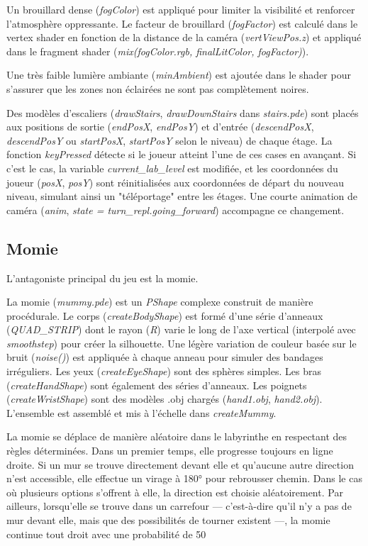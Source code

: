 \documentclass[12pt,oneside,letterpaper]{article}
\begin{document}
Un brouillard dense (\textit{fogColor}) est appliqué pour limiter la visibilité et renforcer l'atmosphère oppressante. Le facteur de brouillard (\textit{fogFactor}) est calculé dans le vertex shader en fonction de la distance de la caméra (\textit{vertViewPos.z}) et appliqué dans le fragment shader (\textit{mix(fogColor.rgb, finalLitColor, fogFactor)}).

Une très faible lumière ambiante (\textit{minAmbient}) est ajoutée dans le shader pour s'assurer que les zones non éclairées ne sont pas complètement noires.

Des modèles d'escaliers (\textit{drawStairs}, \textit{drawDownStairs} dans \textit{stairs.pde}) sont placés aux positions de sortie (\textit{endPosX}, \textit{endPosY}) et d'entrée (\textit{descendPosX}, \textit{descendPosY} ou \textit{startPosX}, \textit{startPosY} selon le niveau) de chaque étage. La fonction \textit{keyPressed} détecte si le joueur atteint l'une de ces cases en avançant. Si c'est le cas, la variable \textit{current\_lab\_level} est modifiée, et les coordonnées du joueur (\textit{posX}, \textit{posY}) sont réinitialisées aux coordonnées de départ du nouveau niveau, simulant ainsi un "téléportage" entre les étages. Une courte animation de caméra (\textit{anim}, \textit{state = turn\_repl.going\_forward}) accompagne ce changement.

\subsection{Momie}

L'antagoniste principal du jeu est la momie.

La momie (\textit{mummy.pde}) est un \textit{PShape} complexe construit de manière procédurale. Le corps (\textit{createBodyShape}) est formé d'une série d'anneaux (\textit{QUAD\_STRIP}) dont le rayon (\textit{R}) varie le long de l'axe vertical (interpolé avec \textit{smoothstep}) pour créer la silhouette. Une légère variation de couleur basée sur le bruit (\textit{noise()}) est appliquée à chaque anneau pour simuler des bandages irréguliers. Les yeux (\textit{createEyeShape}) sont des sphères simples. Les bras (\textit{createHandShape}) sont également des séries d'anneaux. Les poignets (\textit{createWristShape}) sont des modèles .obj chargés (\textit{hand1.obj}, \textit{hand2.obj}). L'ensemble est assemblé et mis à l'échelle dans \textit{createMummy}.

La momie se déplace de manière aléatoire dans le labyrinthe en respectant des règles déterminées. Dans un premier temps, elle progresse toujours en ligne droite. Si un mur se trouve directement devant elle et qu’aucune autre direction n’est accessible, elle effectue un virage à 180° pour rebrousser chemin. Dans le cas où plusieurs options s’offrent à elle, la direction est choisie aléatoirement. Par ailleurs, lorsqu’elle se trouve dans un carrefour --- c’est-à-dire qu’il n’y a pas de mur devant elle, mais que des possibilités de tourner existent ---, la momie continue tout droit avec une probabilité de 50 %
\end{document}
